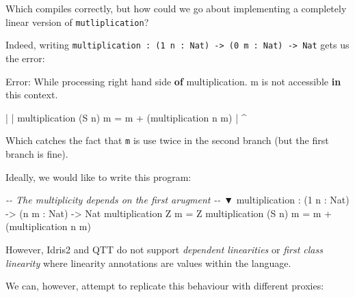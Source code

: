 \documentclass[
]{article}
\newenvironment{Shaded}{}{}
\newcommand{\CommentTok}[1]{\textcolor[rgb]{0.38,0.63,0.69}{\textit{#1}}}
\newcommand{\DataTypeTok}[1]{\textcolor[rgb]{0.56,0.13,0.00}{#1}}
\newcommand{\DecValTok}[1]{\textcolor[rgb]{0.25,0.63,0.44}{#1}}
\newcommand{\FunctionTok}[1]{\textcolor[rgb]{0.02,0.16,0.49}{#1}}
\newcommand{\KeywordTok}[1]{\textcolor[rgb]{0.00,0.44,0.13}{\textbf{#1}}}
\newcommand{\NormalTok}[1]{#1}
\newcommand{\OperatorTok}[1]{\textcolor[rgb]{0.40,0.40,0.40}{#1}}
\newcommand{\OtherTok}[1]{\textcolor[rgb]{0.00,0.44,0.13}{#1}}
\begin{document}
Which compiles correctly, but how could we go about implementing a
completely linear version of \texttt{mutliplication}?

Indeed, writing
\texttt{multiplication\ :\ (1\ n\ :\ Nat)\ -\textgreater{}\ (0\ m\ :\ Nat)\ -\textgreater{}\ Nat}
gets us the error:

\begin{Shaded}
\begin{Highlighting}[]
\DataTypeTok{Error}\OperatorTok{:} \DataTypeTok{While}\NormalTok{ processing right hand side }\KeywordTok{of}\NormalTok{ multiplication}\OperatorTok{.} 
\NormalTok{    m is }\FunctionTok{not}\NormalTok{ accessible }\KeywordTok{in}\NormalTok{ this context}\OperatorTok{.}

    \OperatorTok{|}
    \OperatorTok{|}\NormalTok{ multiplication (}\DataTypeTok{S}\NormalTok{ n) m }\OtherTok{=}\NormalTok{ m }\OperatorTok{+}\NormalTok{ (multiplication n m)}
    \OperatorTok{|}                          \OperatorTok{\^{}}
\end{Highlighting}
\end{Shaded}

Which catches the fact that \texttt{m} is use twice in the second branch
(but the first branch is fine).

Ideally, we would like to write this program:

\begin{Shaded}
\begin{Highlighting}[]
\CommentTok{{-}{-}        The multiplicity depends on the first arugment}
\CommentTok{{-}{-}                               ▼}
\NormalTok{multiplication }\OperatorTok{:}\NormalTok{ (}\DecValTok{1}\NormalTok{ n }\OperatorTok{:} \DataTypeTok{Nat}\NormalTok{) }\OtherTok{{-}\textgreater{}}\NormalTok{ (n m }\OperatorTok{:} \DataTypeTok{Nat}\NormalTok{) }\OtherTok{{-}\textgreater{}} \DataTypeTok{Nat}
\NormalTok{multiplication }\DataTypeTok{Z}\NormalTok{ m }\OtherTok{=} \DataTypeTok{Z}
\NormalTok{multiplication (}\DataTypeTok{S}\NormalTok{ n) m }\OtherTok{=}\NormalTok{ m }\OperatorTok{+}\NormalTok{ (multiplication n m)}
\end{Highlighting}
\end{Shaded}

However, Idris2 and QTT do not support \emph{dependent linearities} or
\emph{first class linearity} where linearity annotations are values
within the language.

We can, however, attempt to replicate this behaviour with different
proxies:
\end{document}

